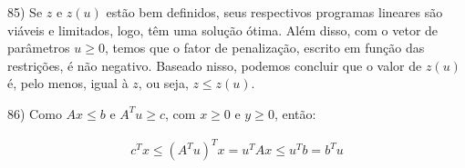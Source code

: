 \documentclass[]{article}
\begin{document}
85) Se $z$ e $z(u)$ estão bem definidos, seus respectivos programas lineares são viáveis e limitados, logo, têm uma solução ótima. Além disso, com o vetor de parâmetros $u \geq 0$, temos que o fator de penalização, escrito em função das restrições, é não negativo. Baseado nisso, podemos concluir que o valor de $z(u)$ é, pelo menos, igual à $z$, ou seja, $z \leq z(u)$.

\vspace{0.5cm}

86) Como $Ax \leq b$ e $A^Tu \geq c$, com $x \geq 0$ e $y \geq 0$, então:

\begin{align*}
c^Tx \leq (A^Tu)^Tx = u^TAx \leq u^Tb = b^Tu
\end{align*}
\end{document}

